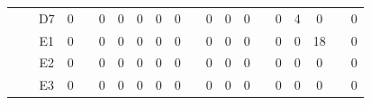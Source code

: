 \documentclass[12pt]{article}
\begin{document}
\begin{table}[!ht]
{\begin{tabular}{clcccccccccccccccccc}
                       & \multicolumn{1}{l|}{} & \multicolumn{1}{c|}{D7}   & \multicolumn{1}{c|}{0}    & \multicolumn{1}{c|}{}                     & \multicolumn{1}{c|}{0}    & \multicolumn{1}{c|}{0}    & \multicolumn{1}{c|}{0}    & \multicolumn{1}{c|}{0}    & \multicolumn{1}{c|}{0}  & \multicolumn{1}{c|}{}                     & \multicolumn{1}{c|}{0}    & \multicolumn{1}{c|}{0}    & \multicolumn{1}{c|}{0}    & \multicolumn{1}{c|}{}                     & \multicolumn{1}{c|}{0}  & \multicolumn{1}{c|}{4}  & \multicolumn{1}{c|}{0}  & \multicolumn{1}{c|}{}                     & \multicolumn{1}{c|}{0}  \\ \cline{3-4} \cline{6-10} \cline{12-14} \cline{16-18} \cline{20-20} 
                       & \multicolumn{1}{l|}{} & \multicolumn{1}{c|}{E1}   & \multicolumn{1}{c|}{0}    & \multicolumn{1}{c|}{}                     & \multicolumn{1}{c|}{0}    & \multicolumn{1}{c|}{0}    & \multicolumn{1}{c|}{0}    & \multicolumn{1}{c|}{0}    & \multicolumn{1}{c|}{0}  & \multicolumn{1}{c|}{}                     & \multicolumn{1}{c|}{0}    & \multicolumn{1}{c|}{0}    & \multicolumn{1}{c|}{0}    & \multicolumn{1}{c|}{}                     & \multicolumn{1}{c|}{0}  & \multicolumn{1}{c|}{0}  & \multicolumn{1}{c|}{18} & \multicolumn{1}{c|}{}                     & \multicolumn{1}{c|}{0}  \\ \cline{3-4} \cline{6-10} \cline{12-14} \cline{16-18} \cline{20-20} 
                       & \multicolumn{1}{l|}{} & \multicolumn{1}{c|}{E2}   & \multicolumn{1}{c|}{0}    & \multicolumn{1}{c|}{}                     & \multicolumn{1}{c|}{0}    & \multicolumn{1}{c|}{0}    & \multicolumn{1}{c|}{0}    & \multicolumn{1}{c|}{0}    & \multicolumn{1}{c|}{0}  & \multicolumn{1}{c|}{}                     & \multicolumn{1}{c|}{0}    & \multicolumn{1}{c|}{0}    & \multicolumn{1}{c|}{0}    & \multicolumn{1}{c|}{}                     & \multicolumn{1}{c|}{0}  & \multicolumn{1}{c|}{0}  & \multicolumn{1}{c|}{0}  & \multicolumn{1}{c|}{}                     & \multicolumn{1}{c|}{0}  \\ \cline{3-4} \cline{6-10} \cline{12-14} \cline{16-18} \cline{20-20} 
                       & \multicolumn{1}{l|}{} & \multicolumn{1}{c|}{E3}   & \multicolumn{1}{c|}{0}    & \multicolumn{1}{c|}{}                     & \multicolumn{1}{c|}{0}    & \multicolumn{1}{c|}{0}    & \multicolumn{1}{c|}{0}    & \multicolumn{1}{c|}{0}    & \multicolumn{1}{c|}{0}  & \multicolumn{1}{c|}{}                     & \multicolumn{1}{c|}{0}    & \multicolumn{1}{c|}{0}    & \multicolumn{1}{c|}{0}    & \multicolumn{1}{c|}{}                     & \multicolumn{1}{c|}{0}  & \multicolumn{1}{c|}{0}  & \multicolumn{1}{c|}{0}  & \multicolumn{1}{c|}{}                     & \multicolumn{1}{c|}{0}  \\ \cline{3-4} \cline{6-10} \cline{12-14} \cline{16-18} \cline{20-20} 

\end{tabular}}
\end{table}
\end{document}
